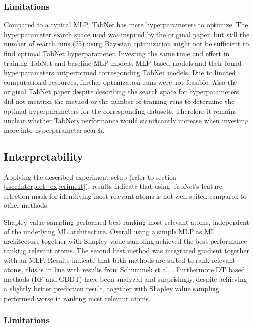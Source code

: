 \documentclass[../main.tex]{subfiles}
\begin{document}
\subsubsection{Limitations}

Compared to a typical MLP, TabNet has more hyperparameters to optimize. The hyperparameter search space used was inspired by the original paper, but still the number of search runs (25) using Bayesian optimization might not be sufficient to find optimal TabNet hyperparameter. Investing the same time and effort in training TabNet and baseline MLP models, MLP based models and their found hyperparameters outperformed corresponding TabNet models. Due to limited computational resources, further optimization runs were not feasible. Also the original TabNet paper \cite{arik_tabnet_2020} despite describing the search space for hyperparameters did not  mention the method or the number of training runs to determine the optimal hyperparameters for the corresponding datasets. Therefore it remains unclear whether TabNets performance would significantly increase when investing more into hyperparameter search.
\newline 

\subsection{Interpretability}

Applying the described experiment setup (refer to section \ref{ssec:interpret_experiment}), results indicate that using TabNet's feature selection mask for identifying most relevant atoms is not well suited compared to other methods. 
\newline

Shapley value sampling performed best ranking most relevant atoms, independent of the underlying ML architecture. Overall using a simple MLP as ML architecture together with Shapley value sampling achieved the best performance ranking relevant atoms. The second best method was integrated gradient together with an MLP. Results indicate that both methods are suited to rank relevant atoms, this is in line with results from Schimunek et al. \cite{schimunek_poster_2021}.
Furthermore DT based methods (RF and GBDT) have been analyzed and surprisingly, despite achieving a slightly better prediction result, together with Shapley value sampling performed worse in ranking most relevant atoms. 

\subsubsection{Limitations} \label{sssec:interpret_experiment_limits}
\end{document}
